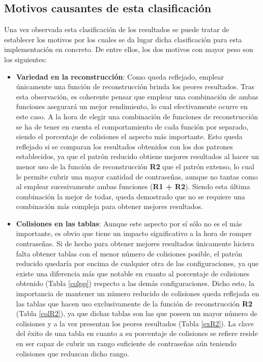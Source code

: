 \documentclass[12pt,spanish,listoffigures,listoftables]{tfgetsinf}
\begin{document}
\subsection{Motivos causantes de esta clasificación}

Una vez observada esta clasificación de los resultados se puede tratar de establecer los motivos por los cuales se da lugar dicha clasificación para esta implementación en concreto. De entre ellos, los dos motivos con mayor peso son los siguientes:

\begin{itemize}

    \item \textbf{Variedad en la reconstrucción}: Como queda reflejado, emplear únicamente una función de reconstrucción brinda los peores resultados. Tras esta observación, es coherente pensar que emplear una combinación de ambas funciones asegurará un mejor rendimiento, lo cual efectivamente ocurre en este caso. A la hora de elegir una combinación de funciones de reconstrucción se ha de tener en cuenta el comportamiento de cada función por separado, siendo el porcentaje de colisiones el aspecto más importante. Esto queda reflejado si se comparan los resultados obtenidos con los dos patrones establecidos, ya que el patrón reducido obtiene mejores resultados al hacer un menor uso de la función de reconstrucción \textbf{R2} que el patrón extenso, lo cual le permite cubrir una mayor cantidad de contraseñas, aunque no tantas como al emplear sucesivamente ambas funciones (\textbf{R1 + R2}). Siendo esta última combinación la mejor de todas, queda demostrado que no se requiere una combinación más compleja para obtener mejores resultados.
    
    \item \textbf{Colisiones en las tablas}: Aunque este aspecto por sí sólo no es el más importante, es obvio que tiene un impacto significativo a la hora de romper contraseñas. Si de hecho para obtener mejores resultados únicamente hiciera falta obtener tablas con el menor número de colisiones posible, el patrón reducido quedaría por encima de cualquier otra de las configuraciones, ya que existe una diferencia más que notable en cuanto al porcentaje de colisiones obtenido (Tabla \ref{colpp}) respecto a las demás configuraciones. Dicho esto, la importancia de mantener un número reducido de colisiones queda reflejada en las tablas que hacen uso exclusivamente de la función de reconstrucción \textbf{R2} (Tabla \ref{colR2}), ya que dichas tablas son las que poseen un mayor número de colisiones y a la vez presentan los peores resultados (Tabla \ref{exR2}). La clave del éxito de una tabla en cuanto a su porcentaje de colisiones se refiere reside en ser capaz de cubrir un rango suficiente de contraseñas aún teniendo colisiones que reduzcan dicho rango.
    
\end{itemize}
\end{document}
